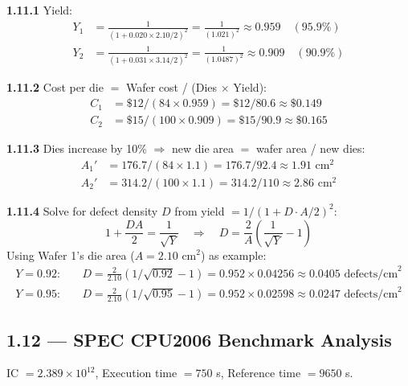\medskip\noindent\textbf{1.11.1} Yield:
\begin{align*}
  Y_1 &= \frac{1}{(1 + 0.020 \times 2.10/2)^2}
       = \frac{1}{(1.021)^2} \approx 0.959 \quad (95.9\%) \\
  Y_2 &= \frac{1}{(1 + 0.031 \times 3.14/2)^2}
       = \frac{1}{(1.0487)^2} \approx 0.909 \quad (90.9\%)
\end{align*}

\noindent\textbf{1.11.2} Cost per die $=$ Wafer cost / (Dies $\times$ Yield):
\begin{align*}
  C_1 &= \$12 / (84 \times 0.959) = \$12 / 80.6 \approx \$0.149 \\
  C_2 &= \$15 / (100 \times 0.909) = \$15 / 90.9 \approx \$0.165
\end{align*}

\noindent\textbf{1.11.3}
Dies increase by 10\% $\Rightarrow$ new die area $=$ wafer area / new dies:
\begin{align*}
  A_1' &= 176.7 / (84 \times 1.1) = 176.7 / 92.4 \approx 1.91\text{ cm}^2 \\
  A_2' &= 314.2 / (100 \times 1.1) = 314.2 / 110 \approx 2.86\text{ cm}^2
\end{align*}

\noindent\textbf{1.11.4}
Solve for defect density $D$ from yield $= 1/(1 + D \cdot A/2)^2$:
\[
  1 + \frac{DA}{2} = \frac{1}{\sqrt{Y}}
  \quad\Rightarrow\quad
  D = \frac{2}{A}\!\left(\frac{1}{\sqrt{Y}} - 1\right)
\]
Using Wafer 1's die area ($A = 2.10$ cm$^2$) as example:
\begin{align*}
  Y = 0.92: &\quad D = \frac{2}{2.10}(1/\sqrt{0.92} - 1)
             = 0.952 \times 0.04256 \approx 0.0405 \text{ defects/cm}^2 \\
  Y = 0.95: &\quad D = \frac{2}{2.10}(1/\sqrt{0.95} - 1)
             = 0.952 \times 0.02598 \approx 0.0247 \text{ defects/cm}^2
\end{align*}

\subsection*{1.12 --- SPEC CPU2006 Benchmark Analysis}
\hypertarget{sol-1.12}{}

IC $= 2.389 \times 10^{12}$, Execution time $= 750$ s, Reference time
$= 9650$ s.


